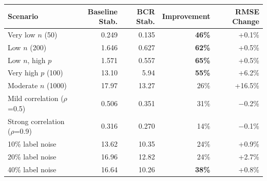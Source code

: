 \begin{tabular}{lrrrr}
\toprule
Scenario & Baseline Stab. & BCR Stab. & Improvement & RMSE Change \\
\midrule
Very low $n$ (50) & 0.249 & 0.135 & \textbf{46\%} & +0.1\% \\
Low $n$ (200) & 1.646 & 0.627 & \textbf{62\%} & +0.5\% \\
Low $n$, high $p$ & 1.571 & 0.557 & \textbf{65\%} & +0.5\% \\
Very high $p$ (100) & 13.10 & 5.94 & \textbf{55\%} & +6.2\% \\
Moderate $n$ (1000) & 17.97 & 13.27 & 26\% & +16.5\% \\
\midrule
Mild correlation ($\rho$=0.5) & 0.506 & 0.351 & 31\% & $-$0.2\% \\
Strong correlation ($\rho$=0.9) & 0.316 & 0.270 & 14\% & $-$0.1\% \\
\midrule
10\% label noise & 13.62 & 10.35 & 24\% & +0.9\% \\
20\% label noise & 16.96 & 12.82 & 24\% & +2.7\% \\
40\% label noise & 16.64 & 10.26 & \textbf{38\%} & +0.8\% \\
\bottomrule
\end{tabular}

